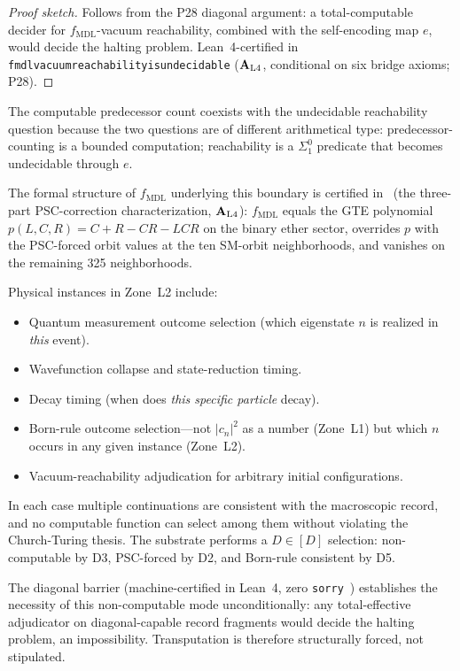 \documentclass[12pt,letterpaper]{article}
\newcommand{\fmdl}{f_{\mathrm{MDL}}}
\newcommand{\Dclass}{[D]}
\newcommand{\catAL}{\ensuremath{\textbf{A}_{\rm L4}}}
\newcommand{\lean}[1]{%
  \penalty-100
  \begingroup\def\_{\textunderscore\allowbreak}\texttt{#1}\endgroup}
\begin{document}
\begin{proof}[Proof sketch]
Follows from the P28 diagonal argument: a total-computable decider for
$\fmdl$-vacuum reachability, combined with the self-encoding map $e$, would decide
the halting problem.
Lean~4-certified in \lean{fmdl\_vacuum\_reachability\_is\_undecidable}
(\catAL, conditional on six bridge axioms; P28).
\end{proof}

The computable predecessor count coexists with the undecidable reachability question
because the two questions are of different arithmetical type: predecessor-counting is
a bounded computation; reachability is a $\Sigma^0_1$ predicate that becomes
undecidable through $e$.

The formal structure of $\fmdl$ underlying this boundary is certified
in~\cite{SpivackPolynomialTransputation} (the three-part PSC-correction
characterization, \catAL): $\fmdl$ equals the GTE polynomial
$p(L,C,R) = C + R - CR - LCR$ on the binary ether sector, overrides $p$
with the PSC-forced orbit values at the ten SM-orbit neighborhoods, and
vanishes on the remaining 325 neighborhoods.

Physical instances in Zone~L2 include:
\begin{itemize}[nosep]
  \item Quantum measurement outcome selection (which eigenstate $n$ is realized
        in \emph{this} event).
  \item Wavefunction collapse and state-reduction timing.
  \item Decay timing (when does \emph{this specific particle} decay).
  \item Born-rule outcome selection---not $|c_n|^2$ as a number (Zone~L1) but
        which $n$ occurs in any given instance (Zone~L2).
  \item Vacuum-reachability adjudication for arbitrary initial configurations.
\end{itemize}

In each case multiple continuations are consistent with the macroscopic record,
and no computable function can select among them without violating the
Church-Turing thesis.  The substrate performs a $D \in \Dclass$ selection:
non-computable by D3, PSC-forced by D2, and Born-rule consistent by D5.

The diagonal barrier (machine-certified in Lean~4, zero
\texttt{sorry}~\cite{SpivackNEMS11}) establishes the necessity of this non-computable
mode unconditionally: any total-effective adjudicator on diagonal-capable record
fragments would decide the halting problem, an impossibility.  Transputation is
therefore structurally forced, not stipulated.
\end{document}
